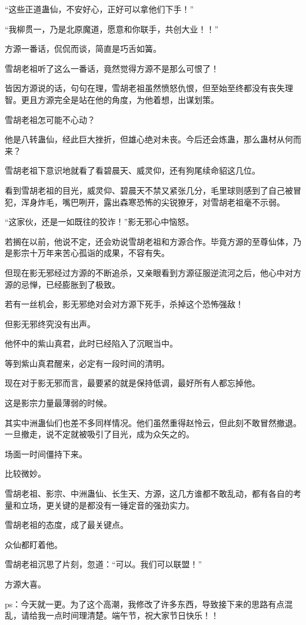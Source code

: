 \begin{this_body}
“这些正道蛊仙，不安好心，正好可以拿他们下手！”

“我柳贯一，乃是北原魔道，愿意和你联手，共创大业！！”

方源一番话，侃侃而谈，简直是巧舌如簧。

雪胡老祖听了这么一番话，竟然觉得方源不是那么可恨了！

皆因方源说的话，句句在理，雪胡老祖虽然愤怒仇恨，但至始至终都没有丧失理智。更且方源完全是站在他的角度，为他着想，出谋划策。

雪胡老祖怎可能不心动？

他是八转蛊仙，经此巨大挫折，但雄心绝对未丧。今后还会炼蛊，那么蛊材从何而来？

雪胡老祖下意识地就看了看碧晨天、威灵仰，还有狗尾续命貂这几位。

看到雪胡老祖的目光，威灵仰、碧晨天不禁又紧张几分，毛里球则感到了自己被冒犯，浑身炸毛，嘴巴咧开，露出森寒恐怖的尖锐獠牙，对雪胡老祖毫不示弱。

“这家伙，还是一如既往的狡诈！”影无邪心中恼怒。

若搁在以前，他说不定，还会劝说雪胡老祖和方源合作。毕竟方源的至尊仙体，乃是影宗十万年来苦心孤诣的成果，不容有失。

但现在影无邪经过方源的不断追杀，又亲眼看到方源征服逆流河之后，他心中对方源的忌惮，已经膨胀到了极致。

若有一丝机会，影无邪绝对会对方源下死手，杀掉这个恐怖强敌！

但影无邪终究没有出声。

他怀中的紫山真君，此时已经陷入了沉眠当中。

等到紫山真君醒来，必定有一段时间的清明。

现在对于影无邪而言，最要紧的就是保持低调，最好所有人都忘掉他。

这是影宗力量最薄弱的时候。

其实中洲蛊仙们也差不多同样情况。他们虽然重得赵怜云，但此刻不敢冒然撤退。一旦撤走，说不定就被吸引了目光，成为众矢之的。

场面一时间僵持下来。

比较微妙。

雪胡老祖、影宗、中洲蛊仙、长生天、方源，这几方谁都不敢乱动，都有各自的考量和立场，更关键的是都没有一锤定音的强劲实力。

雪胡老祖的态度，成了最关键点。

众仙都盯着他。

雪胡老祖沉思了片刻，忽道：“可以。我们可以联盟！”

方源大喜。

ps：今天就一更。为了这个高潮，我修改了许多东西，导致接下来的思路有点混乱，请给我一点时间理清楚。端午节，祝大家节日快乐！！

\end{this_body}

